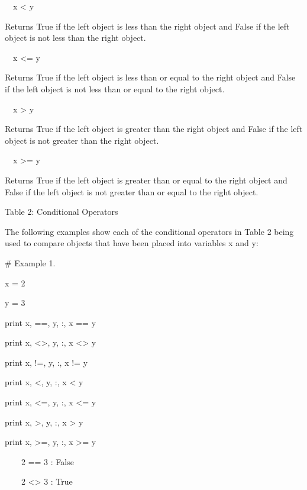 \documentclass[12pt,oneside]{book}
\begin{document}
\ \ x {\textless} y

Returns True if the left object is less than the right object and False if the left object is not less than the right object.

\ \ x {\textless}= y

Returns True if the left object is less than or equal to the right object and False if the left object is not less than or equal to the right object.

\ \ x {\textgreater} y

Returns True if the left object is greater than the right object and False if the left object is not greater than the right object.

\ \ x {\textgreater}= y

Returns True if the left object is greater than or equal to the right object and False if the left object is not greater than or equal to the right object.

Table 2: Conditional Operators


The following examples show each of the conditional operators in Table 2 being used to compare objects that have been placed into variables x and y:


\# Example 1.

x = 2

y = 3 


print x, {\textquotedbl}=={\textquotedbl}, y, {\textquotedbl}:{\textquotedbl}, x == y

print x, {\textquotedbl}{\textless}{\textgreater}{\textquotedbl}, y, {\textquotedbl}:{\textquotedbl}, x {\textless}{\textgreater} y

print x, {\textquotedbl}!={\textquotedbl}, y, {\textquotedbl}:{\textquotedbl}, x != y

print x, {\textquotedbl}{\textless}{\textquotedbl}, y, {\textquotedbl}:{\textquotedbl}, x {\textless} y

print x, {\textquotedbl}{\textless}={\textquotedbl}, y, {\textquotedbl}:{\textquotedbl}, x {\textless}= y

print x, {\textquotedbl}{\textgreater}{\textquotedbl}, y, {\textquotedbl}:{\textquotedbl}, x {\textgreater} y

print x, {\textquotedbl}{\textgreater}={\textquotedbl}, y, {\textquotedbl}:{\textquotedbl}, x {\textgreater}= y

{\textbar}

\ \ \ \ 2 == 3 : False

\ \ \ \ 2 {\textless}{\textgreater} 3 : True
\end{document}

